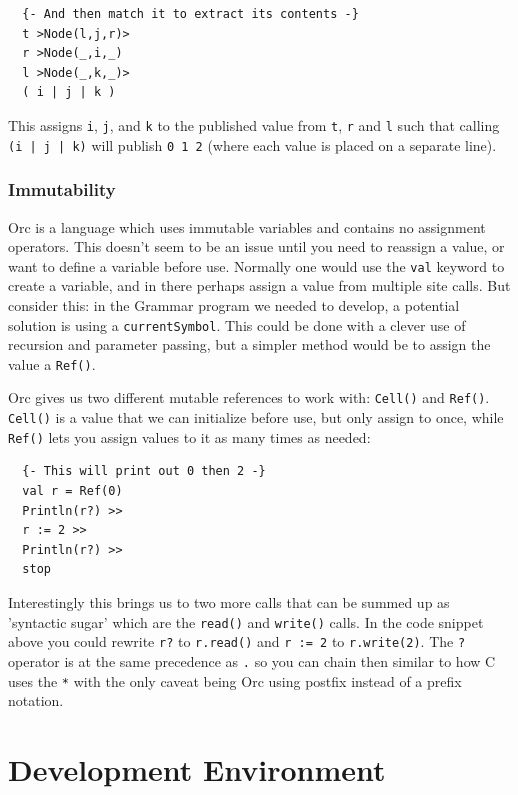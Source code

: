 \documentclass[12pt, letterpaper]{article}
\begin{document}
\begin{lstlisting}
  {- And then match it to extract its contents -}
  t >Node(l,j,r)>
  r >Node(_,i,_)
  l >Node(_,k,_)>
  ( i | j | k )
\end{lstlisting}

This assigns \texttt{i}, \texttt{j}, and \texttt{k} to the published value from \texttt{t}, \texttt{r} and \texttt{l} such that calling \texttt{(i | j | k)} will publish \texttt{0 1 2} (where each value is placed on a separate line).

\subsubsection{Immutability}

Orc is a language which uses immutable variables and contains no assignment operators.  This doesn't seem to be an issue until you need to reassign a value, or want to define a variable before use.  Normally one would use the \texttt{val} keyword to create a variable, and in there perhaps assign a value from multiple site calls.  But consider this: in the Grammar program we needed to develop, a potential solution is using a \texttt{currentSymbol}.  This could be done with a clever use of recursion and parameter passing, but a simpler method would be to assign the value a \texttt{Ref()}.

Orc gives us two different mutable references to work with: \texttt{Cell()} and \texttt{Ref()}.  \texttt{Cell()} is a value that we can initialize before use, but only assign to once, while \texttt{Ref()} lets you assign values to it as many times as needed:

\begin{lstlisting}
  {- This will print out 0 then 2 -}
  val r = Ref(0)
  Println(r?) >>
  r := 2 >>
  Println(r?) >>
  stop
\end{lstlisting}

Interestingly this brings us to two more calls that can be summed up as 'syntactic sugar' which are the \texttt{read()} and \texttt{write()} calls.  In the code snippet above you could rewrite \texttt{r?} to \texttt{r.read()} and \texttt{r := 2} to \texttt{r.write(2)}.  The \texttt{?} operator is at the same precedence as \texttt{.} so you can chain then similar to how C uses the \texttt{*} with the only caveat being Orc using postfix instead of a prefix notation.

\section{Development Environment}
\end{document}
